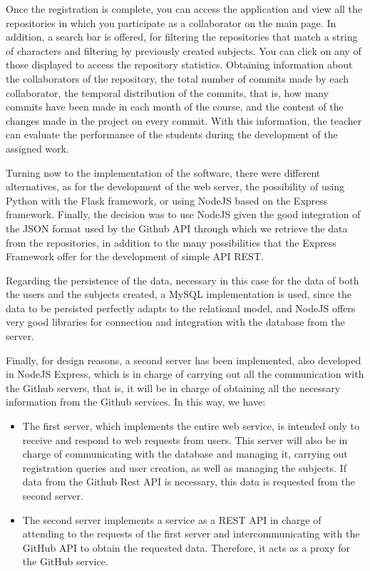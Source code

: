 Once the registration is complete, you can access the application and
view all the repositories in which you participate as a collaborator
on the main page. In addition, a search bar is offered, for filtering
the repositories that match a string of characters and filtering by
previously created subjects. You can click on any of those displayed
to access the repository statistics. Obtaining information about the
collaborators of the repository, the total number of commits made by
each collaborator, the temporal distribution of the commits, that is,
how many commits have been made in each month of the course, and the
content of the changes made in the project on every commit. With this
information, the teacher can evaluate the performance of the students
during the development of the assigned work.

Turning now to the implementation of the software, there were
different alternatives, as for the development of the web server, the
possibility of using Python\cite{Python,PhytonGithub} with the Flask\cite{Flask} framework, or using NodeJS\cite{NodeJS,nodeDoc,CodeShack}
based on the Express\cite{ExpressJS,GitBook,DevDocs} framework. Finally, the decision was to use NodeJS given the good integration of the JSON\cite{json} format used by the Github
API through which we retrieve the data from the repositories, in
addition to the many possibilities that the Express Framework offer
for the development of simple API REST.

Regarding the persistence of the data, necessary in this case for the
data of both the users and the subjects created, a MySQL\cite{MySQL}
implementation is used, since the data to be persisted perfectly
adapts to the relational model, and NodeJS offers very good libraries
for connection and integration with the database from the server.

Finally, for design reasons, a second server has been implemented,
also developed in NodeJS Express, which is in charge of carrying out
all the communication with the Github servers, that is, it will be in
charge of obtaining all the necessary information from the Github
services. In this way, we have:

\begin{itemize}
\item The first server, which implements the entire web service, is
  intended only to receive and respond to web requests from users.
  This server will also be in charge of communicating with the
  database and managing it, carrying out registration queries and user
  creation, as well as managing the subjects. If data from the Github
  Rest API is necessary, this data is requested from the second
  server.

\item The second server implements a service as a REST API in charge
  of attending to the requests of the first server and
  intercommunicating with the GitHub API to obtain the requested data.
  Therefore, it acts as a proxy for the GitHub service.
\end{itemize}

